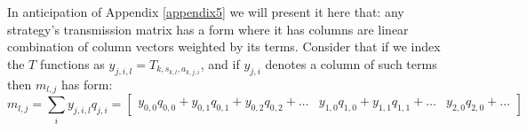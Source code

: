 In anticipation of Appendix \ref{appendix5} we will present it here that: any strategy's transmission matrix has a form where it has columns are linear combination of column vectors weighted by its terms. Consider that if we index the $T$ functions as $y_{j,i,l}=T_{k,s_{k,l},a_{k,j,i}}$, and if $y_{j,i}$ denotes a column of such terms then $m_{l,j}$ has form:
\begin{equation}\label{eq:columns} m_{l,j} = \sum_iy_{j,i,l}q_{j,i} = \left[\begin{array}{c|c|c}
y_{0,0}q_{0,0}+y_{0,1}q_{0,1}+y_{0,2}q_{0,2}+\dots & 
y_{1,0}q_{1,0}+y_{1,1}q_{1,1}+\dots & 
y_{2,0}q_{2,0}+\dots
\end{array}\right]\end{equation}
